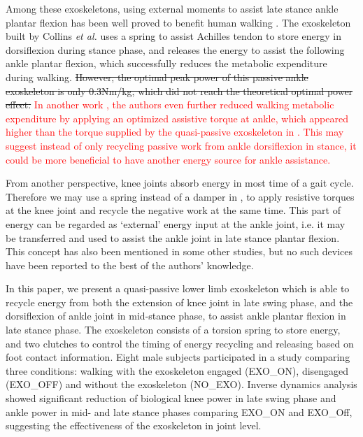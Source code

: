 \documentclass[twocolumn,cleanfoot,10pt]{asme2ej}
\begin{document}
Among these exoskeletons, using external moments to assist late stance ankle plantar flexion has been well proved to benefit human walking \cite{RN5,RN9,RN10,RN11,RN12}.
The exoskeleton built by Collins \emph{et al.}\cite{RN5} uses a spring to assist Achilles tendon to store energy in dorsiflexion during stance phase, and releases the energy to assist the following ankle plantar flexion, which successfully reduces the metabolic expenditure during walking.
\sout{However, the optimal peak power of this passive ankle exoskeleton \cite{RN5} is only 0.3Nm/kg, which did not reach the theoretical optimal power effect\cite{zhang2017human}.}
\textcolor{red}{In another work \cite{zhang2017human}, the authors even further reduced walking metabolic expenditure by applying an optimized assistive torque at ankle, which appeared higher than the torque supplied by the quasi-passive exoskeleton in \cite{RN5}.
This may suggest instead of only recycling passive work from ankle dorsiflexion in stance, it could be more beneficial to have another energy source for ankle assistance.}

From another perspective, knee joints absorb energy in most time of a gait cycle\cite{RN2}.
Therefore we may use a spring instead of a damper in \cite{RN3}, to apply resistive torques at the knee joint and recycle the negative work at the same time.
This part of energy can be regarded as ‘external’ energy input at the ankle joint, i.e. it may be transferred and used to assist the ankle joint in late stance plantar flexion.
This concept has also been mentioned in some other studies\cite{RN3,RN12}, but no such devices have been reported to the best of the authors' knowledge.

In this paper, we present a quasi-passive lower limb exoskeleton which is able to recycle energy from both the extension of knee joint in late swing phase, and the dorsiflexion of ankle joint in mid-stance phase, to assist ankle plantar flexion in late stance phase.
The exoskeleton consists of a torsion spring to store energy, and two clutches to control the timing of energy recycling and releasing based on foot contact information.
Eight male subjects participated in a study comparing three conditions: walking with the exoskeleton engaged (EXO\_ON), disengaged (EXO\_OFF) and without the exoskeleton (NO\_EXO).
Inverse dynamics analysis showed significant reduction of biological knee power in late swing phase and ankle power in mid- and late stance phases comparing EXO\_ON and EXO\_Off, suggesting the effectiveness of the exoskeleton in joint level.
\end{document}
